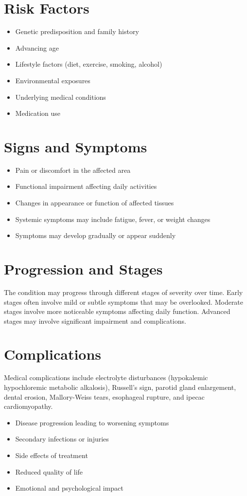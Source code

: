 \section{Risk Factors}
\begin{itemize}[noitemsep]
  \item Genetic predisposition and family history
  \item Advancing age
  \item Lifestyle factors (diet, exercise, smoking, alcohol)
  \item Environmental exposures
  \item Underlying medical conditions
  \item Medication use
\end{itemize}
\section{Signs and Symptoms}
\begin{itemize}[noitemsep]
  \item Pain or discomfort in the affected area
  \item Functional impairment affecting daily activities
  \item Changes in appearance or function of affected tissues
  \item Systemic symptoms may include fatigue, fever, or weight changes
  \item Symptoms may develop gradually or appear suddenly
\end{itemize}
\section{Progression and Stages}
The condition may progress through different stages of severity over time. Early stages often involve mild or subtle symptoms that may be overlooked. Moderate stages involve more noticeable symptoms affecting daily function. Advanced stages may involve significant impairment and complications.
\section{Complications}
Medical complications include electrolyte disturbances (hypokalemic hypochloremic metabolic alkalosis), Russell's sign, parotid gland enlargement, dental erosion, Mallory-Weiss tears, esophageal rupture, and ipecac cardiomyopathy.

\begin{itemize}[noitemsep]
  \item Disease progression leading to worsening symptoms
  \item Secondary infections or injuries
  \item Side effects of treatment
  \item Reduced quality of life
  \item Emotional and psychological impact
\end{itemize}

